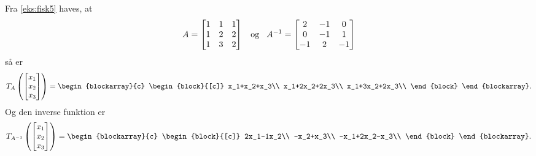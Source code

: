 \begin{eks}
Fra \ref{eks:fisk5} haves, at
\begin{equation*}
A=
\begin{bmatrix}
1 & 1 & 1\\
1 & 2 & 2\\
1 & 3 & 2
\end{bmatrix} \text{\phantom{jd}og\phantom{jd}}
A^{-1}=
\begin{bmatrix}
2 & -1 & 0 \\
0 & -1 & 1 \\
-1 & 2 & -1 \\
\end{bmatrix}
\end{equation*}  
så er
\begin{equation*}
T_A
\left(
\begin{bmatrix}
x_1\\
x_2\\
x_3
\end{bmatrix}
\right)
=
\begin{blockarray}{c}
\begin{block}{[c]}
x_1+x_2+x_3\\
x_1+2x_2+2x_3\\
x_1+3x_2+2x_3\\
\end{block}
\end{blockarray}.
\end{equation*}
Og den inverse funktion er
\begin{equation*}
T_{A^{-1}}\left(
\begin{bmatrix}
x_1\\
x_2\\
x_3
\end{bmatrix}
\right)=
\begin{blockarray}{c}
\begin{block}{[c]}
2x_1-1x_2\\
-x_2+x_3\\
-x_1+2x_2-x_3\\
\end{block}
\end{blockarray}.
\end{equation*}
\end{eks}